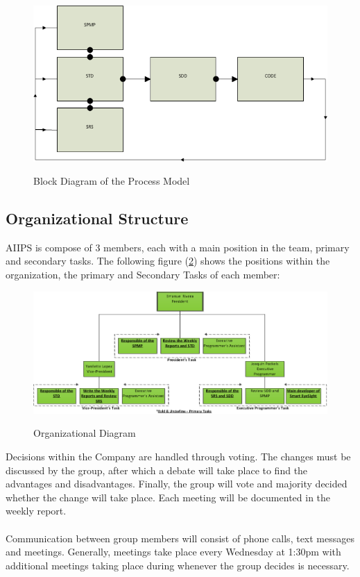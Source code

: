 \documentclass[12pt]{article}
\begin{document}
\begin{figure}[H]\centering
  \includegraphics[width=6.0in]{block_diagram_Org_Struct}\\
  \caption{Block Diagram of the Process Model}\label{org_struct}
  \end{figure}

\subsection{Organizational Structure}
AIIPS is compose of 3 members, each with a main position in the team, primary and secondary tasks. The following figure (\ref{org_diagram}) shows the positions within the organization, the primary and Secondary Tasks of each member:

\begin{figure}[H]\centering
  \includegraphics[width=6.0in]{org_diagram}\\
  \caption{Organizational Diagram}\label{org_diagram}
  \end{figure}
  
Decisions within the Company are handled through voting. The changes must be discussed by the group, after which a debate will take place to find the advantages and disadvantages. Finally, the group will vote and majority decided whether the change will take place. Each meeting will be documented in the weekly report.\\\\
Communication between group members will consist of phone calls, text messages and meetings. Generally, meetings take place every Wednesday at 1:30pm with additional meetings taking place during whenever the group decides is necessary.
\end{document}
